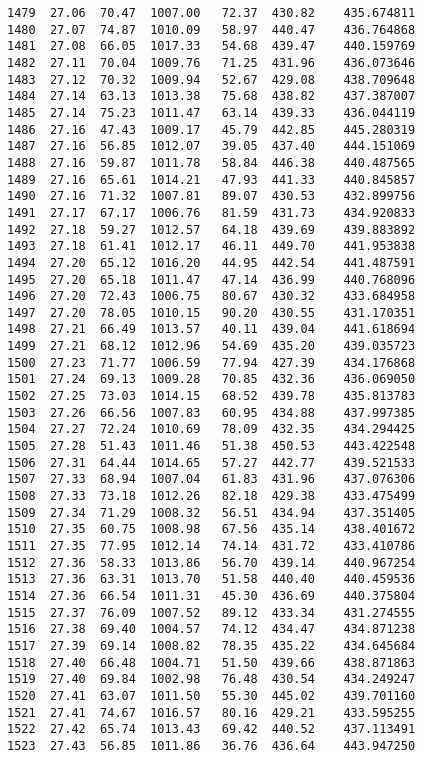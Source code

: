 \documentclass[11pt]{article}
\begin{document}
\begin{tcolorbox}[breakable, size=fbox, boxrule=.5pt, pad at break*=1mm, opacityfill=0]
\begin{Verbatim}[commandchars=\\\{\}]
1479  27.06  70.47  1007.00   72.37  430.82    435.674811
1480  27.07  74.87  1010.09   58.97  440.47    436.764868
1481  27.08  66.05  1017.33   54.68  439.47    440.159769
1482  27.11  70.04  1009.76   71.25  431.96    436.073646
1483  27.12  70.32  1009.94   52.67  429.08    438.709648
1484  27.14  63.13  1013.38   75.68  438.82    437.387007
1485  27.14  75.23  1011.47   63.14  439.33    436.044119
1486  27.16  47.43  1009.17   45.79  442.85    445.280319
1487  27.16  56.85  1012.07   39.05  437.40    444.151069
1488  27.16  59.87  1011.78   58.84  446.38    440.487565
1489  27.16  65.61  1014.21   47.93  441.33    440.845857
1490  27.16  71.32  1007.81   89.07  430.53    432.899756
1491  27.17  67.17  1006.76   81.59  431.73    434.920833
1492  27.18  59.27  1012.57   64.18  439.69    439.883892
1493  27.18  61.41  1012.17   46.11  449.70    441.953838
1494  27.20  65.12  1016.20   44.95  442.54    441.487591
1495  27.20  65.18  1011.47   47.14  436.99    440.768096
1496  27.20  72.43  1006.75   80.67  430.32    433.684958
1497  27.20  78.05  1010.15   90.20  430.55    431.170351
1498  27.21  66.49  1013.57   40.11  439.04    441.618694
1499  27.21  68.12  1012.96   54.69  435.20    439.035723
1500  27.23  71.77  1006.59   77.94  427.39    434.176868
1501  27.24  69.13  1009.28   70.85  432.36    436.069050
1502  27.25  73.03  1014.15   68.52  439.78    435.813783
1503  27.26  66.56  1007.83   60.95  434.88    437.997385
1504  27.27  72.24  1010.69   78.09  432.35    434.294425
1505  27.28  51.43  1011.46   51.38  450.53    443.422548
1506  27.31  64.44  1014.65   57.27  442.77    439.521533
1507  27.33  68.94  1007.04   61.83  431.96    437.076306
1508  27.33  73.18  1012.26   82.18  429.38    433.475499
1509  27.34  71.29  1008.32   56.51  434.94    437.351405
1510  27.35  60.75  1008.98   67.56  435.14    438.401672
1511  27.35  77.95  1012.14   74.14  431.72    433.410786
1512  27.36  58.33  1013.86   56.70  439.14    440.967254
1513  27.36  63.31  1013.70   51.58  440.40    440.459536
1514  27.36  66.54  1011.31   45.30  436.69    440.375804
1515  27.37  76.09  1007.52   89.12  433.34    431.274555
1516  27.38  69.40  1004.57   74.12  434.47    434.871238
1517  27.39  69.14  1008.82   78.35  435.22    434.645684
1518  27.40  66.48  1004.71   51.50  439.66    438.871863
1519  27.40  69.84  1002.98   76.48  430.54    434.249247
1520  27.41  63.07  1011.50   55.30  445.02    439.701160
1521  27.41  74.67  1016.57   80.16  429.21    433.595255
1522  27.42  65.74  1013.43   69.42  440.52    437.113491
1523  27.43  56.85  1011.86   36.76  436.64    443.947250

\end{Verbatim}
\end{tcolorbox}
\end{document}
